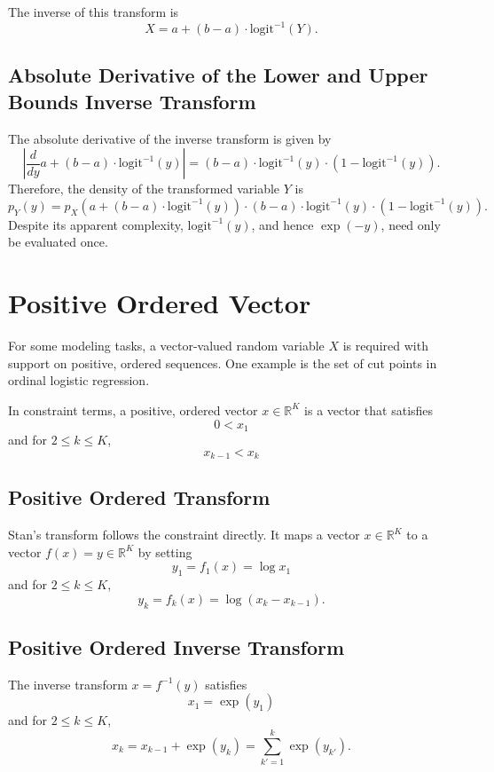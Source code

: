 \documentclass[10pt]{report}
\newcommand{\Stan}{Stan\xspace}
\begin{document}
The inverse of this transform is
%
\[
X = a + (b - a) \cdot \mbox{logit}^{-1}(Y).
\]
%

\subsection{Absolute Derivative of the Lower and Upper Bounds Inverse
  Transform}

The absolute derivative of the inverse transform is given by
\[
\left|  \frac{d}{dy} a + (b - a) \cdot \mbox{logit}^{-1}(y)
    \right|
= (b - a)
    \cdot \mbox{logit}^{-1}(y)
    \cdot \left( 1 - \mbox{logit}^{-1}(y) \right).
\]
Therefore, the density of the transformed variable $Y$ is
%
\[
p_Y(y) 
= 
 p_X \! \left( a + (b - a) \cdot \mbox{logit}^{-1}(y) \right)
    \cdot (b - a)
    \cdot \mbox{logit}^{-1}(y)
    \cdot \left( 1 - \mbox{logit}^{-1}(y) \right).
\]
%
Despite its apparent complexity, $\mbox{logit}^{-1}(y)$, and hence
$\exp(-y)$, need only be evaluated once.


\section{Positive Ordered Vector}

For some modeling tasks, a vector-valued random variable $X$ is
required with support on positive, ordered sequences.  One example is
the set of cut points in ordinal logistic regression.  

In constraint terms, a positive, ordered vector $x \in \mathbb{R}^K$
is a vector that satisfies
\[
0 < x_1
\]
%
and for $2 \leq k \leq K$,
\[
x_{k-1} < x_k
\]
%

\subsection{Positive Ordered Transform}

\Stan's transform follows the constraint directly.  It maps a vector
$x \in \mathbb{R}^{K}$ to a vector $f(x) = y \in \mathbb{R}^K$ by setting
%
\[
y_1 = f_1(x) = \log x_1
\] 
%
and for $2 \leq k \leq K$,
\[
y_k = f_k(x) = \log \left( x_{k} - x_{k-1} \right).
\]

\subsection{Positive Ordered Inverse Transform}

The inverse transform $x = f^{-1}(y)$ satisfies
%
\[
x_1 = \exp(y_1)
\]
%
and for $2 \leq k \leq K$, 
\[
x_k = x_{k-1} + \exp(y_k) = \sum_{k' =1}^{k} \exp(y_{k'}).
\]
\end{document}
